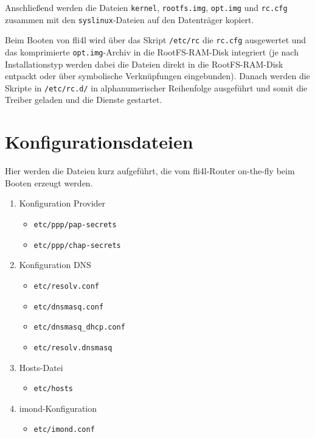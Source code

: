 Anschließend werden die Dateien \texttt{kernel}, \texttt{rootfs.img}, \texttt{opt.img}
und \texttt{rc.cfg} zusammen mit den \texttt{syslinux}-Dateien auf den Datenträger kopiert.

Beim Booten von fli4l wird über das Skript \texttt{/etc/rc} die \texttt{rc.cfg} ausgewertet und das
komprimierte \texttt{opt.img}-Archiv in die RootFS-RAM-Disk integriert (je nach
Installationstyp werden dabei die Dateien direkt in die RootFS-RAM-Disk entpackt
oder über symbolische Verknüpfungen eingebunden).
Danach werden die Skripte in \texttt{/etc/rc.d/} in alphanumerischer Reihenfolge ausgeführt
und somit die Treiber geladen und die Dienste gestartet.


\section{Konfigurationsdateien}

Hier werden die Dateien kurz aufgeführt, die vom fli4l-Router
on-the-fly beim Booten erzeugt werden.

\begin{enumerate}
\item Konfiguration Provider
  \begin{itemize}
  \item         \texttt{etc/ppp/pap-secrets}

  \item         \texttt{etc/ppp/chap-secrets}

  \end{itemize}
\item Konfiguration DNS
  \begin{itemize}
  \item         \texttt{etc/resolv.conf}

  \item         \texttt{etc/dnsmasq.conf}

  \item         \texttt{etc/dnsmasq\_dhcp.conf}

  \item         \texttt{etc/resolv.dnsmasq}

  \end{itemize}


\item Hosts-Datei
  \begin{itemize}
  \item         \texttt{etc/hosts}
  \end{itemize}



\item imond-Konfiguration
  \begin{itemize}
  \item \texttt{etc/imond.conf}
  \end{itemize}

\end{enumerate}


